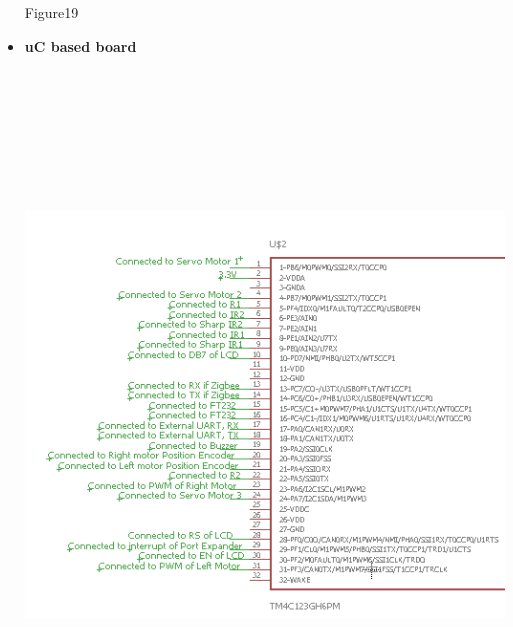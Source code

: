 \documentclass[a4paper,12pt,oneside]{book}
\begin{document}
\begin{itemize}
			\hspace{6 cm}
			Figure19
		\item \textbf{uC based board}\\
			\includegraphics[width=15cm, height=19cm]{Images/uC1}
			

\end{itemize}
\end{document}
